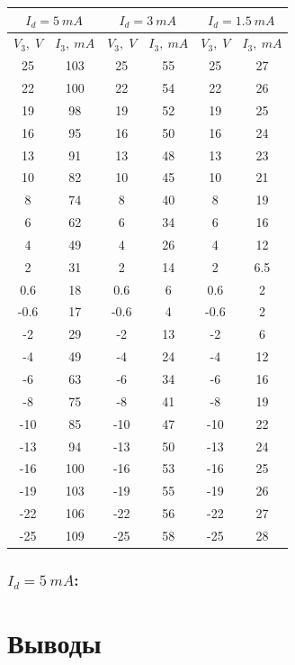 \documentclass{article}
\begin{document}
\begin{table}[H]
    \centering
    \begin{tabular}{|c|c|c|c|c|c|}
    \hline
    \multicolumn{2}{|c|}{\(I_d = 5\: mA\)}& \multicolumn{2}{|c|}{\(I_d = 3\: mA\)} & \multicolumn{2}{|c|}{\(I_d = 1.5\: mA\)} \\\hline
    \(V_3,\; V\) & \(I_3,\: mA\) & \(V_3,\; V\) & \(I_3,\: mA\) & \(V_3,\; V\) & \(I_3,\: mA\)\\\hline
    25 & 103  & 25          & 55& 25           & 27 \\\hline
    22 & 100  & 22          & 54& 22           & 26 \\\hline
    19 & 98   & 19          & 52& 19           & 25 \\\hline
    16 & 95   & 16          & 50& 16           & 24 \\\hline
    13 & 91   & 13          & 48& 13           & 23 \\\hline
    10 & 82   & 10          & 45& 10           & 21 \\\hline
    8  & 74   & 8           & 40& 8            & 19 \\\hline
    6  & 62   & 6           & 34& 6            & 16 \\\hline
    4  & 49   & 4           & 26& 4            & 12 \\\hline
    2  & 31   & 2           & 14& 2            & 6.5\\\hline
    0.6& 18   & 0.6         & 6 & 0.6          & 2  \\\hline
    -0.6 &17  & -0.6        & 4 & -0.6         & 2  \\\hline
    -2 & 29   & -2          & 13& -2           & 6  \\\hline
    -4 & 49   & -4          & 24& -4           & 12 \\\hline
    -6 & 63   & -6          & 34& -6           & 16 \\\hline
    -8 & 75   & -8          & 41& -8           & 19 \\\hline
    -10& 85   & -10         & 47& -10          & 22 \\\hline
    -13& 94   & -13         & 50& -13          & 24 \\\hline
    -16& 100  & -16         & 53& -16          & 25 \\\hline
    -19& 103  & -19         & 55& -19          & 26 \\\hline
    -22& 106  & -22         & 56& -22          & 27 \\\hline
    -25& 109  & -25         & 58& -25          & 28 \\\hline
    \end{tabular}
\end{table}

\subsubsection*{\(I_d = 5\: mA\):}



\section{Выводы}
\end{document}
